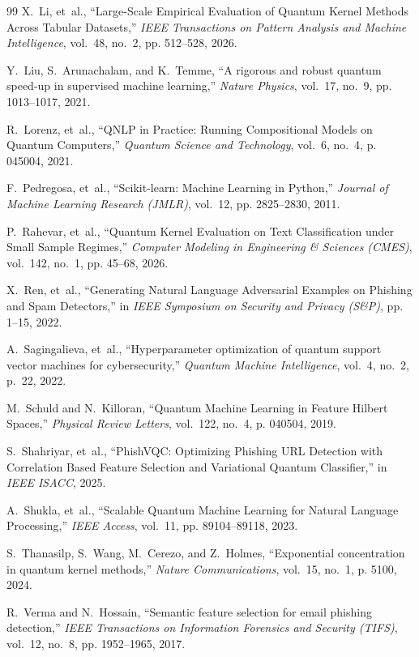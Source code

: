 \documentclass{article}
\begin{document}
\begin{thebibliography}{99}
X.~Li, et~al.,
\newblock ``Large-Scale Empirical Evaluation of Quantum Kernel Methods Across Tabular Datasets,''
\newblock \emph{IEEE Transactions on Pattern Analysis and Machine Intelligence}, vol.~48, no.~2, pp. 512--528, 2026.

Y.~Liu, S.~Arunachalam, and K.~Temme,
\newblock ``A rigorous and robust quantum speed-up in supervised machine learning,''
\newblock \emph{Nature Physics}, vol.~17, no.~9, pp. 1013--1017, 2021.

R.~Lorenz, et~al.,
\newblock ``QNLP in Practice: Running Compositional Models on Quantum Computers,''
\newblock \emph{Quantum Science and Technology}, vol.~6, no.~4, p. 045004, 2021.

F.~Pedregosa, et~al.,
\newblock ``Scikit-learn: Machine Learning in Python,''
\newblock \emph{Journal of Machine Learning Research (JMLR)}, vol.~12, pp. 2825--2830, 2011.

P.~Rahevar, et~al.,
\newblock ``Quantum Kernel Evaluation on Text Classification under Small Sample Regimes,''
\newblock \emph{Computer Modeling in Engineering \& Sciences (CMES)}, vol.~142, no.~1, pp. 45--68, 2026.

X.~Ren, et~al.,
\newblock ``Generating Natural Language Adversarial Examples on Phishing and Spam Detectors,''
\newblock in \emph{IEEE Symposium on Security and Privacy (S\&P)}, pp. 1--15, 2022.

A.~Sagingalieva, et~al.,
\newblock ``Hyperparameter optimization of quantum support vector machines for cybersecurity,''
\newblock \emph{Quantum Machine Intelligence}, vol.~4, no.~2, p.~22, 2022.

M.~Schuld and N.~Killoran,
\newblock ``Quantum Machine Learning in Feature Hilbert Spaces,''
\newblock \emph{Physical Review Letters}, vol.~122, no.~4, p. 040504, 2019.

S.~Shahriyar, et~al.,
\newblock ``PhishVQC: Optimizing Phishing URL Detection with Correlation Based Feature Selection and Variational Quantum Classifier,''
\newblock in \emph{IEEE ISACC}, 2025.

A.~Shukla, et~al.,
\newblock ``Scalable Quantum Machine Learning for Natural Language Processing,''
\newblock \emph{IEEE Access}, vol.~11, pp. 89104--89118, 2023.

S.~Thanasilp, S.~Wang, M.~Cerezo, and Z.~Holmes,
\newblock ``Exponential concentration in quantum kernel methods,''
\newblock \emph{Nature Communications}, vol.~15, no.~1, p. 5100, 2024.

R.~Verma and N.~Hossain,
\newblock ``Semantic feature selection for email phishing detection,''
\newblock \emph{IEEE Transactions on Information Forensics and Security (TIFS)}, vol.~12, no.~8, pp. 1952--1965, 2017.

\end{thebibliography}
\end{document}

